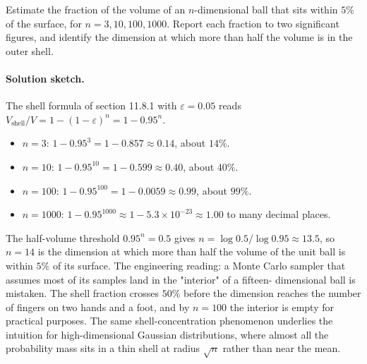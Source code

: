 \begin{exercise}
Estimate the fraction of the volume of an $n$-dimensional ball that
sits within $5\%$ of the surface, for $n = 3, 10, 100, 1000$.
Report each fraction to two significant figures, and identify the
dimension at which more than half the volume is in the outer shell.

\paragraph{Solution sketch.} The shell formula of section 11.8.1
with $\varepsilon = 0.05$ reads $V_{\text{shell}}/V = 1 - (1 -
\varepsilon)^{n} = 1 - 0.95^{n}$.
\begin{itemize}[leftmargin=*]
  \item $n = 3$: $1 - 0.95^{3} = 1 - 0.857 \approx 0.14$, about
    $14\%$.
  \item $n = 10$: $1 - 0.95^{10} = 1 - 0.599 \approx 0.40$, about
    $40\%$.
  \item $n = 100$: $1 - 0.95^{100} = 1 - 0.0059 \approx 0.99$,
    about $99\%$.
  \item $n = 1000$: $1 - 0.95^{1000} \approx 1 - 5.3 \times 10^{
    -23} \approx 1.00$ to many decimal places.
\end{itemize}
The half-volume threshold $0.95^{n} = 0.5$ gives $n = \log 0.5 /
\log 0.95 \approx 13.5$, so $n = 14$ is the dimension at which more
than half the volume of the unit ball is within $5\%$ of its
surface. The engineering reading: a Monte Carlo sampler that
assumes most of its samples land in the "interior" of a fifteen-
dimensional ball is mistaken. The shell fraction crosses $50\%$
before the dimension reaches the number of fingers on two hands and
a foot, and by $n = 100$ the interior is empty for practical
purposes. The same shell-concentration phenomenon underlies the
 intuition for high-dimensional Gaussian
distributions, where almost all the probability mass sits in a thin
shell at radius $\sqrt{n}$ rather than near the mean.
\end{exercise}


